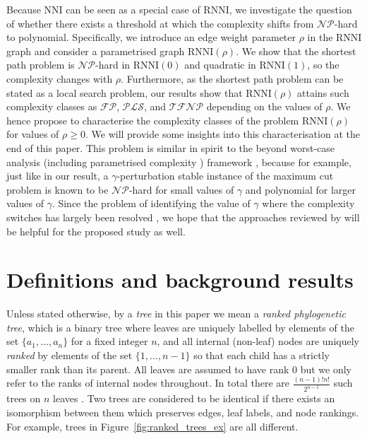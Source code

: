 \documentclass[11pt]{amsart}
\newcommand{\rnni}{\mathrm{RNNI}}
\newcommand{\nni}{\mathrm{NNI}}
\newcommand{\pls}{\mathcal{PLS}}
\newcommand{\tfnp}{\mathcal{TFNP}}
\newcommand{\fpc}{\mathcal{FP}}
\newcommand{\np}{\mathcal{NP}}
\begin{document}
Because $\nni$ can be seen as a special case of $\rnni$, we investigate the question of whether there exists a threshold at which the complexity shifts from $\np$-hard to polynomial.
Specifically, we introduce an edge weight parameter $\rho$ in the $\rnni$ graph and consider a parametrised graph $\rnni(\rho)$.
We show that the shortest path problem is $\np$-hard in $\rnni(0)$ and quadratic in $\rnni(1)$, so the complexity changes with $\rho$.
Furthermore, as the shortest path problem can be stated as a local search problem, our results show that $\rnni(\rho)$ attains such complexity classes as $\fpc$, $\pls$, and $\tfnp$ depending on the values of $\rho$.
We hence propose to characterise the complexity classes of the problem $\rnni(\rho)$ for values of $\rho \geq 0$.
We will provide some insights into this characterisation at the end of this paper.
This problem is similar in spirit to the beyond worst-case analysis (including parametrised complexity \autocite{Downey2013-nd}) framework \autocite{Roughgarden2019-to}, because for example, just like in our result, a $\gamma$-perturbation stable instance of the maximum cut problem is known \autocite{Roughgarden2019-to} to be $\np$-hard for small values of $\gamma$ and polynomial for larger values of $\gamma$.
Since the problem of identifying the value of $\gamma$ where the complexity switches has largely been resolved \autocite{Makarychev2014-ev}, we hope that the approaches reviewed by \textcite{Roughgarden2019-to} will be helpful for the proposed study as well.


\section{Definitions and background results}

Unless stated otherwise, by a \emph{tree} in this paper we mean a \emph{ranked phylogenetic tree}, which is a binary tree where leaves are uniquely labelled by elements of the set $\{a_1, \ldots, a_n\}$ for a fixed integer $n$, and all internal (non-leaf) nodes are uniquely \emph{ranked} by elements of the set $\{1, \ldots, n-1\}$ so that each child has a strictly smaller rank than its parent.
All leaves are assumed to have rank $0$ but we only refer to the ranks of internal nodes throughout.
In total there are $\frac{(n - 1)! n!}{2^{n-1}}$ such trees on $n$ leaves \autocite{Gavryushkin2018-ol}.
Two trees are considered to be identical if there exists an isomorphism between them which preserves edges, leaf labels, and node rankings.
For example, trees in Figure~\ref{fig:ranked_trees_ex} are all different.
\end{document}
